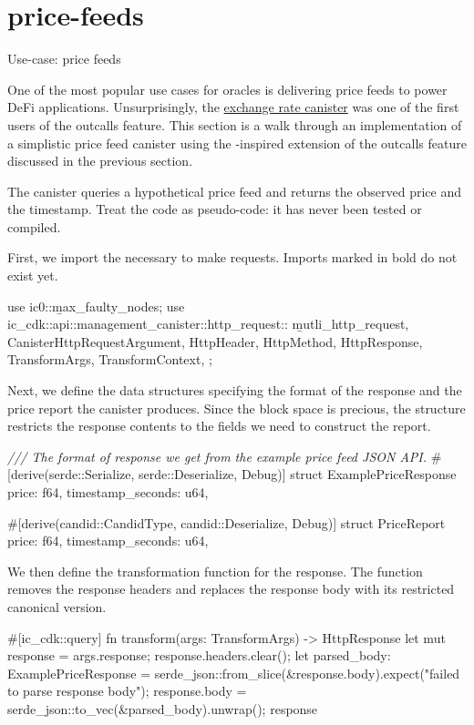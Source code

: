 \documentclass{article}
\begin{document}
\section{price-feeds}{Use-case: price feeds}

One of the most popular use cases for oracles is delivering price feeds to power DeFi applications.
Unsurprisingly, the \href{https://internetcomputer.org/docs/current/developer-docs/defi/exchange-rate-canister}{exchange rate canister} was one of the first users of the  outcalls feature.
This section is a walk through an implementation of a simplistic price feed canister using the -inspired extension of the  outcalls feature discussed in the previous section.

The canister queries a hypothetical price feed  and returns the observed price and the timestamp.
Treat the code as pseudo-code: it has never been tested or compiled.

First, we import the necessary  to make  requests.
Imports marked in bold do not exist yet.

\begin{code}[rust]
use ic0::\b{max_faulty_nodes};
use ic_cdk::api::management_canister::http_request::{
    \b{mutli_http_request},
    CanisterHttpRequestArgument, HttpHeader, HttpMethod, HttpResponse, TransformArgs,
    TransformContext,
};
\end{code}

Next, we define the data structures specifying the format of the  response and the price report the canister produces.
Since the block space is precious, the  structure restricts the response contents to the fields we need to construct the report.

\begin{code}[rust]
\emph{/// The format of response we get from the example price feed JSON API.}
#[derive(serde::Serialize, serde::Deserialize, Debug)]
struct ExamplePriceResponse {
    price: f64,
    timestamp_seconds: u64,
}

#[derive(candid::CandidType, candid::Deserialize, Debug)]
struct PriceReport {
    price: f64,
    timestamp_seconds: u64,
}
\end{code}

We then define the transformation function for the  response.
The function removes the response headers and replaces the response body with its restricted canonical version.

\begin{code}[rust]
#[ic_cdk::query]
fn transform(args: TransformArgs) -> HttpResponse {
    let mut response = args.response;
    response.headers.clear();
    let parsed_body: ExamplePriceResponse =
        serde_json::from_slice(&response.body).expect("failed to parse response body");
    response.body = serde_json::to_vec(&parsed_body).unwrap();
    response
}
\end{code}
\end{document}
